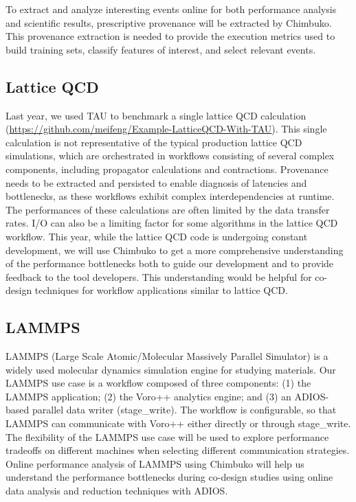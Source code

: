To extract and analyze interesting events online for both performance analysis and scientific results, prescriptive provenance will be extracted by Chimbuko.  This provenance extraction is needed to provide the execution metrics used to build training sets, classify features of interest, and select relevant events. 

\subsection{Lattice QCD}
Last year, we used TAU to benchmark a single lattice QCD calculation (\url{https://github.com/meifeng/Example-LatticeQCD-With-TAU}).   This single calculation is not representative of the typical production lattice QCD simulations, which are orchestrated in workflows consisting of several complex components, including propagator calculations and contractions. Provenance needs to be extracted and persisted to enable diagnosis of latencies and bottlenecks, as these workflows exhibit complex interdependencies at runtime. The performances of these calculations are often limited by the data transfer rates. I/O can also be a limiting factor for some algorithms in the lattice QCD workflow. This year, while the lattice QCD code is undergoing constant development, we will use Chimbuko to get a more comprehensive understanding of the performance bottlenecks both to guide our development and to provide feedback to the tool developers. This understanding would be helpful for co-design techniques for workflow applications similar to lattice QCD.

\subsection{LAMMPS}
LAMMPS (Large Scale Atomic/Molecular Massively Parallel Simulator) is a widely used molecular dynamics simulation engine for studying materials. Our LAMMPS use case is a workflow composed of three components: (1) the LAMMPS application; (2) the Voro++ analytics engine; and (3) an ADIOS-based parallel data writer (stage\_write). The workflow is configurable, so that LAMMPS can communicate with Voro++ either directly or through stage\_write. The flexibility of the LAMMPS use case will be used to explore performance tradeoffs on different machines when selecting different communication strategies.
Online performance analysis of LAMMPS using Chimbuko will help us understand the performance bottlenecks during co-design studies using online data analysis and reduction techniques with ADIOS.

